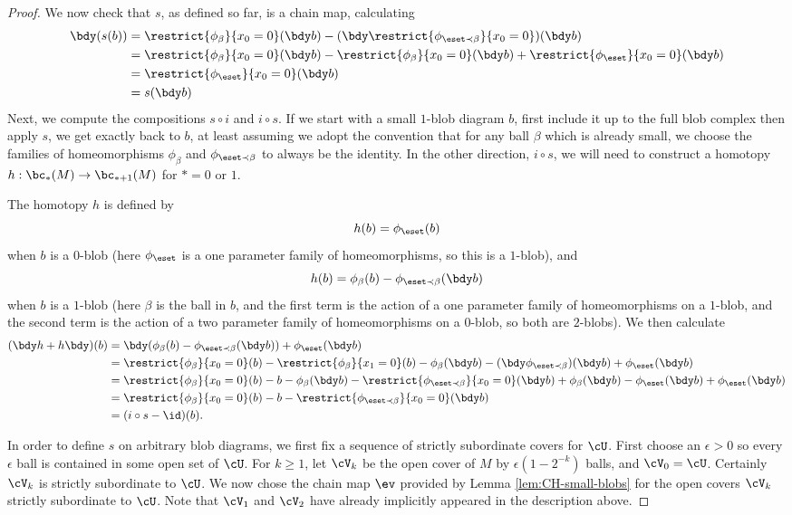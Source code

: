 \begin{proof}
We now check that $s$, as defined so far, is a chain map, calculating
\begin{align*}
\bdy (s(b)) & = \restrict{\phi_\beta}{x_0=0}(\bdy b) - (\bdy \restrict{\phi_{\eset \prec \beta}}{x_0=0})(\bdy b) \\
		 & = \restrict{\phi_\beta}{x_0=0}(\bdy b) - \restrict{\phi_\beta}{x_0=0}(\bdy b) + \restrict{\phi_\eset}{x_0=0}(\bdy b) \\
		 & = \restrict{\phi_\eset}{x_0=0}(\bdy b) \\
		 & = s(\bdy b)
\end{align*}
Next, we compute the compositions $s \circ i$ and $i \circ s$. If we start with a small $1$-blob diagram $b$, first include it up to the full blob complex then apply $s$, we get exactly back to $b$, at least assuming we adopt the convention that for any ball $\beta$ which is already small, we choose the families of homeomorphisms $\phi_\beta$ and $\phi_{\eset \prec \beta}$ to always be the identity. In the other direction, $i \circ s$, we will need to construct a homotopy $h:\bc_*(M) \to \bc_{*+1}(M)$ for $*=0$ or $1$.

The homotopy $h$ is defined by $$h(b) = \phi_\eset(b)$$ when $b$ is a $0$-blob (here $\phi_\eset$ is a one parameter family of homeomorphisms, so this is a $1$-blob), and $$h(b) = \phi_\beta(b) - \phi_{\eset \prec \beta}(\bdy b)$$ when $b$ is a $1$-blob (here $\beta$ is the ball in $b$, and the first term is the action of a one parameter family of homeomorphisms on a $1$-blob, and the second term is the action of a two parameter family of homeomorphisms on a $0$-blob, so both are $2$-blobs). We then calculate
\begin{align*}
(\bdy h+h \bdy)(b) & = \bdy (\phi_{\beta}(b) - \phi_{\eset \prec \beta}(\bdy b)) + \phi_\eset(\bdy b)  \\
	& =  \restrict{\phi_\beta}{x_0=0}(b) - \restrict{\phi_\beta}{x_1=0}(b) - \phi_\beta(\bdy b) - (\bdy \phi_{\eset \prec \beta})(\bdy b) + \phi_\eset(\bdy b) \\
	& =  \restrict{\phi_\beta}{x_0=0}(b) - b - \phi_\beta(\bdy b) - \restrict{\phi_{\eset \prec \beta}}{x_0=0}(\bdy b) +  \phi_\beta(\bdy b) - \phi_\eset(\bdy b) + \phi_\eset(\bdy b) \\
	& = \restrict{\phi_\beta}{x_0=0}(b) - b - \restrict{\phi_{\eset \prec \beta}}{x_0=0}(\bdy b) \\
	& = (i \circ s - \id)(b).
\end{align*}


In order to define $s$ on arbitrary blob diagrams, we first fix a sequence of strictly subordinate covers for $\cU$. First choose an $\epsilon > 0$ so every $\epsilon$ ball is contained in some open set of $\cU$. For $k \geq 1$, let $\cV_{k}$ be the open cover of $M$ by $\epsilon (1-2^{-k})$ balls, and $\cV_0 = \cU$. Certainly $\cV_k$ is strictly subordinate to $\cU$. We now chose the chain map $\ev$ provided by Lemma \ref{lem:CH-small-blobs} for the open covers $\cV_k$ strictly subordinate to $\cU$. Note that $\cV_1$ and $\cV_2$ have already implicitly appeared in the description above.


\end{proof}
